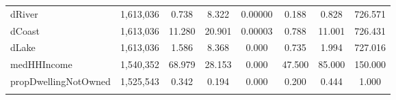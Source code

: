 \documentclass{article}
\begin{document}
\begin{table}[!htbp]
\begin{tabular}{@{\extracolsep{5pt}}lccccccc}
dRiver & 1,613,036 & 0.738 & 8.322 & 0.00000 & 0.188 & 0.828 & 726.571 \\ 
dCoast & 1,613,036 & 11.280 & 20.901 & 0.00003 & 0.788 & 11.001 & 726.431 \\ 
dLake & 1,613,036 & 1.586 & 8.368 & 0.000 & 0.735 & 1.994 & 727.016 \\ 
medHHIncome & 1,540,352 & 68.979 & 28.153 & 0.000 & 47.500 & 85.000 & 150.000 \\ 
propDwellingNotOwned & 1,525,543 & 0.342 & 0.194 & 0.000 & 0.200 & 0.444 & 1.000 \\ 
\hline \\[-1.8ex] 
\end{tabular} 
\end{table} 

\end{document}
